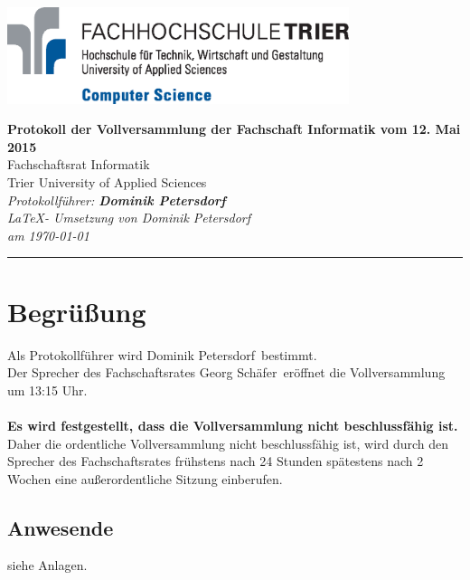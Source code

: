 \documentclass[a4paper, 11pt]{article} %
\newcommand{\protokoller}{Dominik Petersdorf}
\newcommand{\dateOfMeeting}{12. Mai 2015}
\newcommand{\TeXer}{Dominik Petersdorf}
\newcommand{\fsiPresident}{Georg Schäfer}
\begin{document}

\doublespacing
\thispagestyle{empty}

\begin{center}
\includegraphics[width=10.0cm]{../logo_faculty_computer_science.eps}

\vspace*{\fill}
\begin{singlespace}
	{\LARGE \textbf{Protokoll der Vollversammlung der Fachschaft Informatik 
			\singlespacing
			vom \dateOfMeeting}}\\
			Fachschaftsrat Informatik\\
			Trier University of Applied Sciences\\
			\vspace{2.5cm}
			\textit{
			Protokollführer: \textbf{\protokoller} \\
			\LaTeX - Umsetzung von \TeXer\\
			am \today
	}
\end{singlespace}

\vfill
\end{center}

\hspace*{-35cm}
\textcolor{fsi}{\rule{64.9cm}{15pt}}
\pagebreak
 
\setcounter{tocdepth}{2}
\tableofcontents 
\pagebreak

\section{Begrüßung}
Als Protokollführer wird \protokoller~bestimmt.\\
Der Sprecher des Fachschaftsrates \fsiPresident~eröffnet die Vollversammlung um 13:15 Uhr.
\\\\
\textbf{Es wird festgestellt, dass die Vollversammlung nicht beschlussfähig ist.}
Daher die ordentliche Vollversammlung nicht beschlussfähig ist, wird durch den Sprecher des Fachschaftsrates frühstens nach 24 Stunden spätestens nach 2 Wochen eine außerordentliche Sitzung einberufen.
\subsection{Anwesende}
siehe Anlagen.
\end{document}
